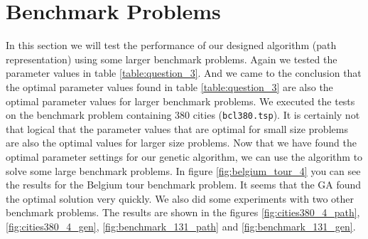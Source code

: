 

\section{Benchmark Problems}

In this section we will test the performance of our designed algorithm (path representation) using some larger benchmark problems. Again we tested the parameter values in table \ref{table:question_3}. And we came to the conclusion that the optimal parameter values found in table \ref{table:question_3} are also the optimal parameter values for larger benchmark problems. We executed the tests on the benchmark problem containing 380 cities (\texttt{bcl380.tsp}). It is certainly not that logical that the parameter values that are optimal for small size problems are also the optimal values for larger size problems. Now that we have found the optimal parameter settings for our genetic algorithm, we can use the algorithm to solve some large benchmark problems.
In figure \ref{fig:belgium_tour_4} you can see the results for the Belgium tour benchmark problem. It seems that the GA found the optimal solution very quickly. We also did some experiments with two other benchmark problems. The results are shown in the figures \ref{fig:cities380_4_path}, \ref{fig:cities380_4_gen}, \ref{fig:benchmark_131_path} and \ref{fig:benchmark_131_gen}.


